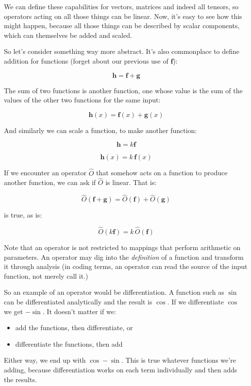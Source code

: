 We can define these capabilities for vectors, matrices and indeed all tensors, so operators acting on all those things can be linear. Now, it's easy to see how this might happen, because all those things can be described by scalar components, which can themselves be added and scaled.

So let's consider something way more abstract. It's also commonplace to define addition for functions (forget about our previous use of $\mathbf{f}$):

$$\mathbf{h} = \mathbf{f} + \mathbf{g}$$

The sum of two functions is another function, one whose value is the sum of the values of the other two functions for the same input:

$$\mathbf{h}(x) = \mathbf{f}(x) + \mathbf{g}(x)$$

And similarly we can scale a function, to make another function:

$$\mathbf{h} = k \mathbf{f}$$

$$\mathbf{h}(x) = k \,\mathbf{f}(x)$$

If we encounter an operator $\hat{O}$ that somehow acts on a function to produce another function, we can ask if $\hat{O}$ is linear. That is:

$$\hat{O}(\mathbf{f} + \mathbf{g}) = \hat{O}(\mathbf{f}) + \hat{O}(\mathbf{g})$$

is true, as is:

$$\hat{O}(k\mathbf{f}) = k\,\hat{O}(\mathbf{f})$$

Note that an operator is not restricted to mappings that perform arithmetic on parameters. An operator may dig into the \textit{definition} of a function and transform it through analysis (in coding terms, an operator can read the source of the input function, not merely call it.)

So an example of an operator would be differentiation. A function such as $\sin$ can be differentiated analytically and the result is $\cos$. If we differentiate $\cos$ we get $-\sin$. It doesn't matter if we:

\begin{itemize}    
    \item add the functions, then differentiate, or
    \item differentiate the functions, then add
\end{itemize}

Either way, we end up with $\cos - \sin$. This is true whatever functions we're adding, because differentiation works on each term individually and then adds the results.

